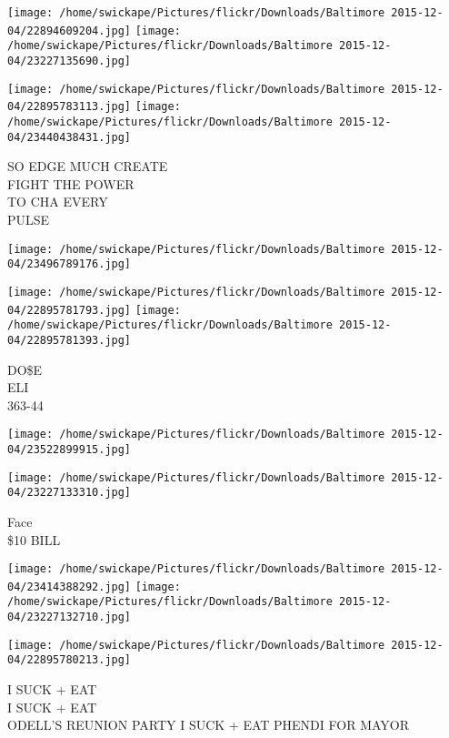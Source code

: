 \documentclass[10pt,letterpaper]{article}
\begin{document}
\texttt{[image: /home/swickape/Pictures/flickr/Downloads/Baltimore 2015-12-04/22894609204.jpg]}
\texttt{[image: /home/swickape/Pictures/flickr/Downloads/Baltimore 2015-12-04/23227135690.jpg]}

\texttt{[image: /home/swickape/Pictures/flickr/Downloads/Baltimore 2015-12-04/22895783113.jpg]}
\texttt{[image: /home/swickape/Pictures/flickr/Downloads/Baltimore 2015-12-04/23440438431.jpg]}

SO EDGE MUCH CREATE\\
FIGHT THE POWER\\
TO CHA EVERY\\
PULSE\\
\pagebreak

\texttt{[image: /home/swickape/Pictures/flickr/Downloads/Baltimore 2015-12-04/23496789176.jpg]}

\vspace{0.25in}
\texttt{[image: /home/swickape/Pictures/flickr/Downloads/Baltimore 2015-12-04/22895781793.jpg]}
\texttt{[image: /home/swickape/Pictures/flickr/Downloads/Baltimore 2015-12-04/22895781393.jpg]}

DO\$E\\
ELI\\
363{-}44\\
\pagebreak

\texttt{[image: /home/swickape/Pictures/flickr/Downloads/Baltimore 2015-12-04/23522899915.jpg]}

\vspace{0.25in}
\texttt{[image: /home/swickape/Pictures/flickr/Downloads/Baltimore 2015-12-04/23227133310.jpg]}

Face\\
\$10 BILL\\
\pagebreak

\texttt{[image: /home/swickape/Pictures/flickr/Downloads/Baltimore 2015-12-04/23414388292.jpg]}
\texttt{[image: /home/swickape/Pictures/flickr/Downloads/Baltimore 2015-12-04/23227132710.jpg]}

\vspace{0.25in}
\texttt{[image: /home/swickape/Pictures/flickr/Downloads/Baltimore 2015-12-04/22895780213.jpg]}

I SUCK + EAT\\
I SUCK + EAT\\
ODELL'S REUNION PARTY I SUCK + EAT PHENDI FOR MAYOR\\
\pagebreak
\end{document}
